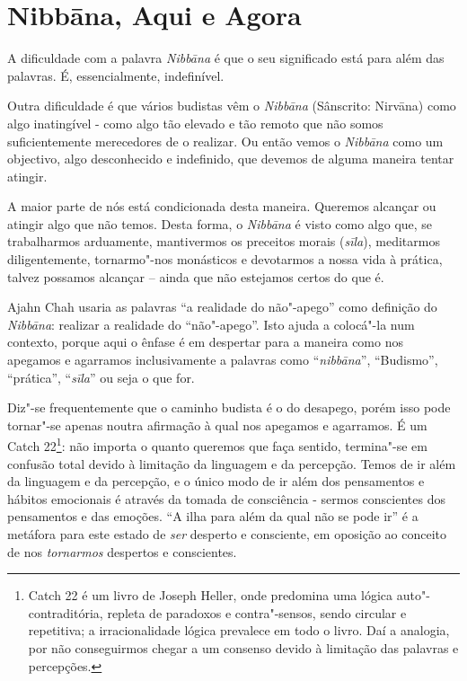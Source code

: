 \chapter{Nibbāna, Aqui e Agora}

A dificuldade com a palavra \emph{Nibbāna} é que o seu significado está
para além das palavras. É, essencialmente, indefinível.

Outra dificuldade é que vários budistas vêm o \emph{Nibbāna} (Sânscrito:
Nirvāna) como algo inatingível - como algo tão elevado e tão remoto que
não somos suficientemente merecedores de o realizar. Ou então vemos o
\emph{Nibbāna} como um objectivo, algo desconhecido e indefinido, que
devemos de alguma maneira tentar atingir.

A maior parte de nós está condicionada desta maneira. Queremos alcançar
ou atingir algo que não temos. Desta forma, o \emph{Nibbāna} é visto
como algo que, se trabalharmos arduamente, mantivermos os preceitos
morais (\emph{sīla}), meditarmos diligentemente, tornarmo"-nos monásticos
e devotarmos a nossa vida à prática, talvez possamos alcançar -- ainda
que não estejamos certos do que é.

Ajahn Chah usaria as palavras ``a realidade do não"-apego'' como
definição do \emph{Nibbāna}: realizar a realidade do ``não"-apego''. Isto
ajuda a colocá"-la num contexto, porque aqui o ênfase é em despertar para
a maneira como nos apegamos e agarramos inclusivamente a palavras como
``\emph{nibbāna}'', ``Budismo'', ``prática'', ``\emph{sīla}'' ou seja o
que for.

Diz"-se frequentemente que o caminho budista é o do desapego, porém isso
pode tornar"-se apenas noutra afirmação à qual nos apegamos e agarramos.
É um Catch 22\footnote{%
Catch 22 é um livro de Joseph Heller, onde predomina uma lógica
auto"-contraditória, repleta de paradoxos e contra"-sensos, sendo circular
e repetitiva; a irracionalidade lógica prevalece em todo o livro. Daí a
analogia, por não conseguirmos chegar a um consenso devido à limitação
das palavras e percepções.}:
não importa o quanto queremos que faça sentido,
termina"-se em confusão total devido à limitação da linguagem e da
percepção. Temos de ir além da linguagem e da percepção, e o único modo
de ir além dos pensamentos e hábitos emocionais é através da tomada de
consciência - sermos conscientes dos pensamentos e das emoções. ``A ilha
para além da qual não se pode ir'' é a metáfora para este estado de
\emph{ser} desperto e consciente, em oposição ao conceito de nos
\emph{tornarmos} despertos e conscientes.

